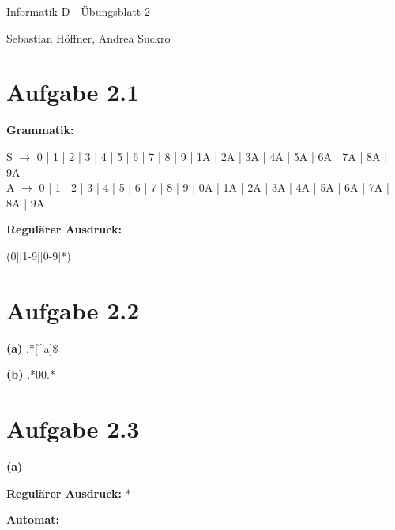 \documentclass{article}
\begin{document}
\begin{center}
  \Large{Informatik D - \"Ubungsblatt 2}

  \large{Sebastian H\"offner, Andrea Suckro}
\end{center}

\section{Aufgabe 2.1}

\textbf{Grammatik:}

\small
S $\rightarrow$ 0 | 1 | 2 | 3 | 4 | 5 | 6 | 7 | 8 | 9 | 1A | 2A | 3A | 4A | 5A | 6A | 7A | 8A | 9A \\
A $\rightarrow$ 0 | 1 | 2 | 3 | 4 | 5 | 6 | 7 | 8 | 9 | 0A | 1A | 2A | 3A | 4A | 5A | 6A | 7A | 8A | 9A

\normalsize
\textbf{Regul\"arer Ausdruck:}

(0|[1-9][0-9]*)

\section{Aufgabe 2.2}
\textbf{(a) } .*[\^{}a]\$

\textbf{(b) } .*00.*


\section{Aufgabe 2.3}
\textbf{(a) }

\textbf{Regul\"arer Ausdruck:} \Smiley\Smiley{[}\Smiley\Neutrey\Sadey{]}*\Sadey\Sadey

\textbf{Automat:}

\begin{center}
\end{center}
\end{document}
